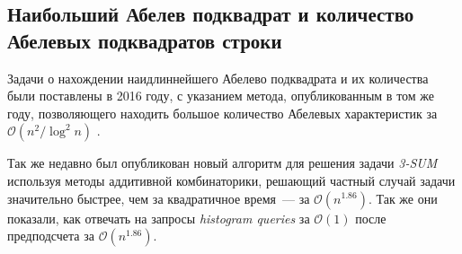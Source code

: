 \subsection{Наибольший Абелев подквадрат и количество Абелевых подквадратов строки}
Задачи о нахождении наидлиннейшего Абелево подквадрата и их количества были поставлены в 2016 году, с указанием метода, опубликованным в том же году, позволяющего находить большое количество Абелевых характеристик за $\mathcal{O}(n^2 / \log^2 n)$ \cite{5}.

Так же недавно был опубликован новый алгоритм для решения задачи \textit{3-SUM} используя методы аддитивной комбинаторики, решающий частный случай задачи значительно быстрее, чем за квадратичное время~--- за $\mathcal{O}(n^{1.86})$. Так же они показали, как отвечать на запросы \textit{histogram queries} за $\mathcal{O}(1)$ после предподсчета за $\mathcal{O}(n^{1.86})$.
